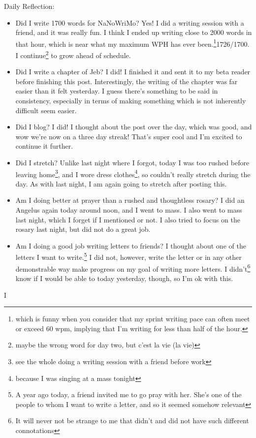 \documentclass[12pt]{article}[titlepage]
\newcommand{\1}{\={a}}
\newcommand{\2}{\={e}}
\newcommand{\3}{\={\i}}
\newcommand{\4}{\=o}
\newcommand{\5}{\=u}
\newcommand{\6}{\={A}}
\renewcommand{\,}{\textsuperscript{,}}
\begin{document}
Daily Reflection:
\begin{itemize}
\item Did I write 1700 words for NaNoWriMo? Yes! I did a writing session with a friend, and it was really fun. I think I ended up writing close to 2000 words in that hour, which is near what my maximum WPH has ever been.\footnote{which is funny when you consider that my sprint writing pace can often meet or exceed 60 wpm, implying that I'm writing for less than half of the hour.}1726/1700. I continue\footnote{maybe the wrong word for day two, but c'est la vie (la vie)} to grow ahead of schedule.
\item Did I write a chapter of Jeb? I did! I finished it and sent it to my beta reader before finishing this post.
Interestingly, the writing of the chapter was far easier than it felt yesterday.
I guess there's something to be said in consistency, especially in terms of making something which is not inherently difficult seem easier.
\item Did I blog? I did! I thought about the post over the day, which was good, and wow we're now on a three day streak! That's super cool and I'm excited to continue it further.
\item Did I stretch? Unlike last night where I forgot, today I was too rushed before leaving home\footnote{see the whole doing a writing session with a friend before work}, and I wore dress clothes\footnote{because I was singing at a mass tonight}, so couldn't really stretch during the day.
As with last night, I am again going to stretch after posting this.
\item Am I doing better at prayer than a rushed and thoughtless rosary? I did an Angelus again today around noon, and I went to mass.
I also went to mass last night, which I forget if I mentioned or not.
I also tried to focus on the rosary last night, but did not do a great job.
\item Am I doing a good job writing letters to friends?
I thought about one of the letters I want to write.\footnote{A year ago today, a friend invited me to go pray with her.
She's one of the people to whom I want to write a letter, and so it seemed somehow relevant}
I did not, however, write the letter or in any other demonstrable way make progress on my goal of writing more letters.
I didn't\footnote{It will never not be strange to me that didn't and did not have such different connotations} know if I would be able to today yesterday, though, so I'm ok with this.
\end{itemize}

I
\end{document}
